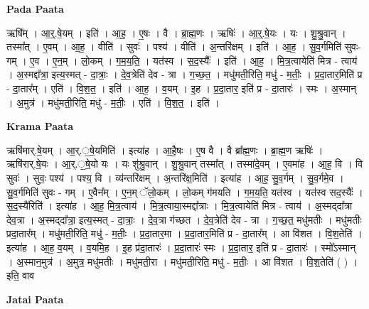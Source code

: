 \documentclass[17pt]{extarticle}
\begin{document}
\textbf{Pada Paata} \newline

ऋषि᳚म् । आ॒र्॒.षे॒यम् । इति॑ । आ॒ह॒ । ए॒षः । वै । ब्रा॒ह्म॒णः । ऋषिः॑ । आ॒र्॒.षे॒यः । यः । शु॒श्रु॒वान् । तस्मा᳚त् । ए॒वम् । आ॒ह॒ । वीति॑ । सुवः॑ । पश्य॑ । वीति॑ । अ॒न्तरि॑क्षम् । इति॑ । आ॒ह॒ । सु॒व॒र्गमिति॑ सुवः-गम् । ए॒व । ए॒न॒म् । लो॒कम् । ग॒म॒य॒ति॒ । यत॑स्व । स॒द॒स्यैः᳚ । इति॑ । आ॒ह॒ । मि॒त्र॒त्वायेति॑ मित्र - त्वाय॑ । अ॒स्मद्दा᳚त्रा॒ इत्य॒स्मत् - दा॒त्राः॒ । दे॒व॒त्रेति॑ देव - त्रा । ग॒च्छ॒त॒ । मधु॑मती॒रिति॒ मधु॑ - म॒तीः॒ । प्र॒दा॒तार॒मिति॑ प्र - दा॒तार᳚म् । एति॑ । वि॒श॒त॒ । इति॑ । आ॒ह॒ । व॒यम् । इ॒ह । प्र॒दा॒तार॒ इति॑ प्र - दा॒तारः॑ । स्मः । अ॒स्मान् । अ॒मुत्र॑ । मधु॑मती॒रिति॒ मधु॑ - म॒तीः॒ । एति॑ । वि॒श॒त॒ । इति॑ ।  \newline


\textbf{Krama Paata} \newline

ऋषि॑मार्.षे॒यम् । आ॒र्.॒षे॒यमिति॑ । इत्या॑ह । आ॒है॒षः । ए॒ष वै । वै ब्रा᳚ह्म॒णः । ब्रा॒ह्म॒ण ऋषिः॑ । ऋषि॑रार्.षे॒यः । आ॒र्.॒षे॒यो यः । यः शु॑श्रु॒वान् । शु॒श्रु॒वान् तस्मा᳚त् । तस्मा॑दे॒वम् । ए॒वमा॑ह । आ॒ह॒ वि । वि सुवः॑ । सुवः॒ पश्य॑ । पश्य॒ वि । व्य॑न्तरि॑क्षम् । अ॒न्तरि॑क्ष॒मिति॑ । इत्या॑ह । आ॒ह॒ सु॒व॒र्गम् । सु॒व॒र्गमे॒व । सु॒व॒र्गमिति॑ सुवः - गम् । ए॒वैन᳚म् । ए॒न॒म् ॅलो॒कम् । लो॒कम् ग॑मयति । ग॒म॒य॒ति॒ यत॑स्व । यत॑स्व सद॒स्यैः᳚ । स॒द॒स्यै॑रिति॑ । इत्या॑ह । आ॒ह॒ मि॒त्र॒त्वाय॑ । मि॒त्र॒त्वाया॒स्मद्दा᳚त्राः । मि॒त्र॒त्वायेति॑ मित्र - त्वाय॑ । 
अ॒स्मद्‍दा᳚त्रा देव॒त्रा । अ॒स्मद्‍दा᳚त्रा॒ इत्य॒स्मत् - दा॒त्राः॒ । दे॒व॒त्रा ग॑च्छत । दे॒व॒त्रेति॑ देव - त्रा । ग॒च्छ॒त॒ मधु॑मतीः । मधु॑मतीः प्रदा॒तार᳚म् । मधु॑मती॒रिति॒ मधु॑ - म॒तीः॒ । प्र॒दा॒तार॒मा । प्र॒दा॒तार॒मिति॑ प्र - दा॒तार᳚म् । आ वि॑शत । वि॒श॒तेति॑ । इत्या॑ह । आ॒ह॒ व॒यम् । व॒यमि॒ह । इ॒ह प्र॑दा॒तारः॑ । प्र॒दा॒तारः॑ स्मः । प्र॒दा॒तार॒ इति॑ प्र - दा॒तारः॑ । स्मो᳚ऽस्मान् । अ॒स्मान॒मुत्र॑ । अ॒मुत्र॒ मधु॑मतीः । मधु॑मती॒रा । मधु॑मती॒रिति॒ मधु॑ - म॒तीः॒ । आ वि॑शत । वि॒श॒तेति॑ ( ) । इति॒ वाव \newline

\textbf{Jatai Paata} \newline
\end{document}
